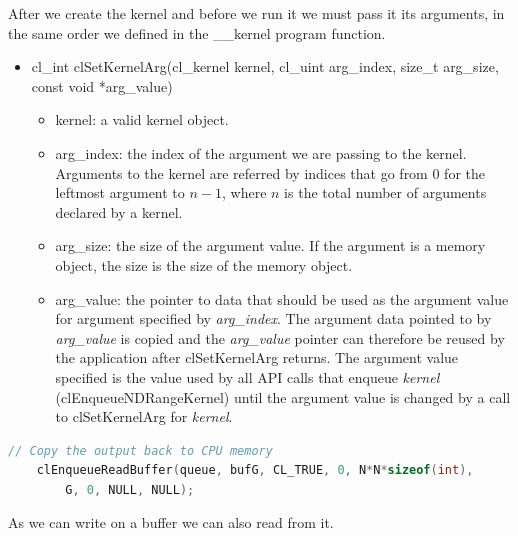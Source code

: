 \documentclass[titlepage]{article}
\begin{document}
After we create the kernel and before we run it we must pass it its arguments, in the same order we defined in the \_\_kernel program function.

\begin{itemize}
    \item cl\_int clSetKernelArg(cl\_kernel kernel, cl\_uint arg\_index, size\_t arg\_size, const void *arg\_value)
    \begin{itemize}
        \item kernel: a valid kernel object.
        \item arg\_index: the index of the argument we are passing to the kernel. Arguments to the kernel are referred by indices that go from $0$ for the leftmost argument to $n - 1$, where $n$ is the total number of arguments declared by a kernel.
        \item arg\_size: the size of the argument value. If the argument is a memory object, the size is the size of the memory object. 
        \item arg\_value: the pointer to data that should be used as the argument value for argument specified by \textit{arg\_index}. The argument data pointed to by \textit{arg\_value} is copied and the \textit{arg\_value} pointer can therefore be reused by the application after clSetKernelArg returns. The argument value specified is the value used by all API calls that enqueue \textit{kernel} (clEnqueueNDRangeKernel) until the argument value is changed by a call to clSetKernelArg for \textit{kernel}.
    \end{itemize}
\end{itemize}

\begin{minipage}{\linewidth}
\begin{lstlisting}[language=C, style=customc, breaklines=true]
    // Copy the output back to CPU memory
    clEnqueueReadBuffer(queue, bufG, CL_TRUE, 0, N*N*sizeof(int),
        G, 0, NULL, NULL);
\end{lstlisting}
\end{minipage}

As we can write on a buffer we can also read from it.
\end{document}
